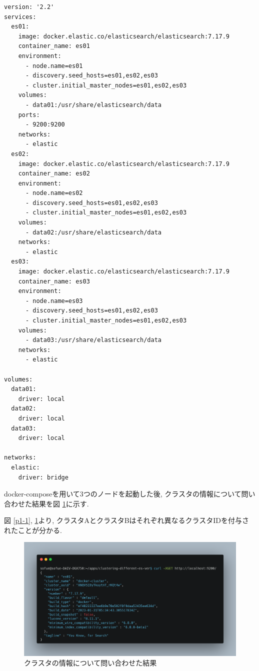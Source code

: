 \documentclass[a4j,12pt,]{jarticle}
\begin{document}
\begin{lstlisting}[caption=クラスタBの構築の際に使用したdocker-compose.yml, label=sc2]
version: '2.2'
services:
  es01:
    image: docker.elastic.co/elasticsearch/elasticsearch:7.17.9
    container_name: es01
    environment:
      - node.name=es01
      - discovery.seed_hosts=es01,es02,es03
      - cluster.initial_master_nodes=es01,es02,es03
    volumes:
      - data01:/usr/share/elasticsearch/data
    ports:
      - 9200:9200
    networks:
      - elastic
  es02:
    image: docker.elastic.co/elasticsearch/elasticsearch:7.17.9
    container_name: es02
    environment:
      - node.name=es02
      - discovery.seed_hosts=es01,es02,es03
      - cluster.initial_master_nodes=es01,es02,es03
    volumes:
      - data02:/usr/share/elasticsearch/data
    networks:
      - elastic
  es03:
    image: docker.elastic.co/elasticsearch/elasticsearch:7.17.9
    container_name: es03
    environment:
      - node.name=es03
      - discovery.seed_hosts=es01,es02,es03
      - cluster.initial_master_nodes=es01,es02,es03
    volumes:
      - data03:/usr/share/elasticsearch/data
    networks:
      - elastic

volumes:
  data01:
    driver: local
  data02:
    driver: local
  data03:
    driver: local

networks:
  elastic:
    driver: bridge
\end{lstlisting}

docker-composeを用いて3つのノードを起動した後, クラスタの情報について問い合わせた結果を図 \ref{p2-1}に示す.

図 \ref{p1-1}, \ref{p2-1}より, クラスタAとクラスタBはそれぞれ異なるクラスタIDを付与されたことが分かる.

\begin{figure}[H]
  \begin{center}
    \includegraphics[width=160mm]{3nodes-cluster.png}
    \caption{クラスタの情報について問い合わせた結果}
    \label{p2-1}
  \end{center}
\end{figure}
\end{document}

